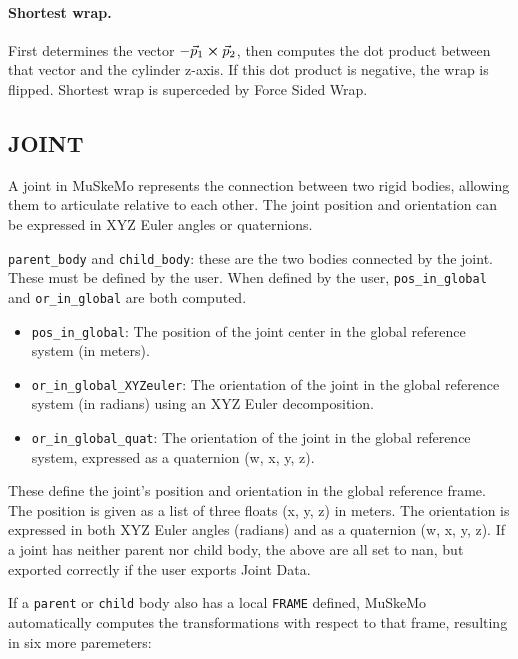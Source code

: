 \documentclass{article}
\begin{document}
\paragraph{Shortest wrap.} First determines the vector $-\vec{p}_{1} \cross \vec{p}_{2}$, then computes the dot product between that vector and the cylinder z-axis. If this dot product is negative, the wrap is flipped. Shortest wrap is superceded by Force Sided Wrap.


\subsection{JOINT}
\label{sec:joint}

A joint in MuSkeMo represents the connection between two rigid bodies, allowing them to articulate relative to each other. The joint position and orientation can be expressed in XYZ Euler angles or quaternions.

\texttt{parent\_body} and \texttt{child\_body}: these are the two bodies connected by the joint. These must be defined by the user. When defined by the user, \texttt{pos\_in\_global} and \texttt{or\_in\_global} are both computed.

\begin{itemize}
    \item \texttt{pos\_in\_global}: The position of the joint center in the global reference system (in meters).
    \item \texttt{or\_in\_global\_XYZeuler}: The orientation of the joint in the global reference system (in radians) using an XYZ Euler decomposition.
    \item \texttt{or\_in\_global\_quat}: The orientation of the joint in the global reference system, expressed as a quaternion (w, x, y, z).
\end{itemize}

These define the joint's position and orientation in the global reference frame. The position is given as a list of three floats (x, y, z) in meters. The orientation is expressed in both XYZ Euler angles (radians) and as a quaternion (w, x, y, z). If a joint has neither parent nor child body, the above are all set to nan, but exported correctly if the user exports Joint Data.

If a \texttt{parent} or \texttt{child} body also has a local \texttt{FRAME} defined, MuSkeMo automatically computes the transformations with respect to that frame, resulting in six more paremeters:
\end{document}
